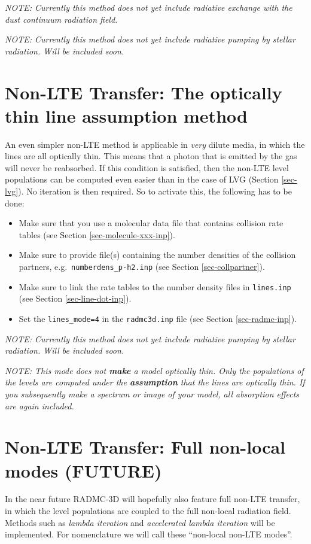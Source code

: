 \documentclass{report}
\begin{document}
{\em NOTE: Currently this method does not yet include radiative exchange
      with the dust continuum radiation field.}

{\em NOTE: Currently this method does not yet include radiative pumping
  by stellar radiation. Will be included soon.}


\section{Non-LTE Transfer: The optically thin line assumption method}
\label{sec-optthinpop}
%
An even simpler non-LTE method is applicable in {\em very} dilute
media, in which the lines are all optically thin. This means that
a photon that is emitted by the gas will never be reabsorbed. 
If this condition is satisfied, then the non-LTE level populations
can be computed even easier than in the case of LVG (Section
\ref{sec-lvg}). No iteration is then required. So to activate
this, the following has to be done:
\begin{itemize}
\item Make sure that you use a molecular data file that contains
  collision rate tables (see Section \ref{sec-molecule-xxx-inp}).
\item Make sure to provide file(s) containing the number densities
  of the collision partners, e.g.~{\small\tt numberdens\_p-h2.inp}
  (see Section \ref{sec-collpartner}).
\item Make sure to link the rate tables to the number density
  files in {\small\tt lines.inp} (see Section \ref{sec-line-dot-inp}).
\item Set the {\small\tt lines\_mode=4} in the {\small\tt radmc3d.inp}
  file (see Section \ref{sec-radmc-inp}).
\end{itemize}

{\em NOTE: Currently this method does not yet include radiative pumping
  by stellar radiation. Will be included soon.}

{\em NOTE: This mode does not {\bf make} a model optically thin. Only
the populations of the levels are computed under the {\bf assumption}
that the lines are optically thin. If you subsequently make a spectrum
or image of your model, all absorption effects are again included.}

\section{Non-LTE Transfer: Full non-local modes (FUTURE)}
\label{sec-nonlte-nonlocal}
%
In the near future RADMC-3D will hopefully also feature full non-LTE
transfer, in which the level populations are coupled to the full 
non-local radiation field. Methods such as {\em lambda iteration}
and {\em accelerated lambda iteration} will be implemented. For
nomenclature we will call these ``non-local non-LTE modes''. 
\end{document}
